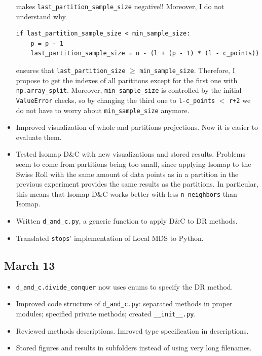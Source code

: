 \documentclass[a4paper,12pt]{article}
\begin{document}
\begin{itemize}
    makes \verb|last_partition_sample_size| negative!! Moreover, I do not understand why
    \begin{verbatim}
if last_partition_sample_size < min_sample_size:
    p = p - 1
    last_partition_sample_size = n - (l + (p - 1) * (l - c_points))
    \end{verbatim}
    ensures that \verb|last_partition_size| $\geq$ \verb|min_sample_size|. Therefore, I propose to get the indexes of all parititons except for the first one with \texttt{np.array\_split}. Moreover, \verb|min_sample_size| is controlled by the initial \verb|ValueError| checks, so by changing the third one to \verb|l-c_points| $<$ \verb|r+2| we do not have to worry about \verb|min_sample_size| anymore.
    \item Improved visualization of whole and partitions projections. Now it is easier to evaluate them.
    \item Tested Isomap D\&C with new visualizations and stored results. Problems seem to come from partitions being too small, since applying Isomap to the Swiss Roll with the same amount of data points as in a partition in the previous experiment provides the same results as the partitions. In particular, this means that Isomap D\&C works better with less \verb|n_neighbors| than Isomap.
    \item Written \verb|d_and_c.py|, a generic function to apply D\&C to DR methods.
    \item Translated \texttt{stops}' implementation of Local MDS to Python.
\end{itemize}

\subsection{March 13}

\begin{itemize}
    \item \verb|d_and_c.divide_conquer| now uses enums to specify the DR method.
    \item Improved code structure of \verb|d_and_c.py|: separated methods in proper modules; specified private methods; created \verb|__init__.py|.
    \item Reviewed methods descriptions. Imroved type specification in descriptions.
    \item Stored figures and results in subfolders instead of using very long filenames.
\end{itemize}
\end{document}
